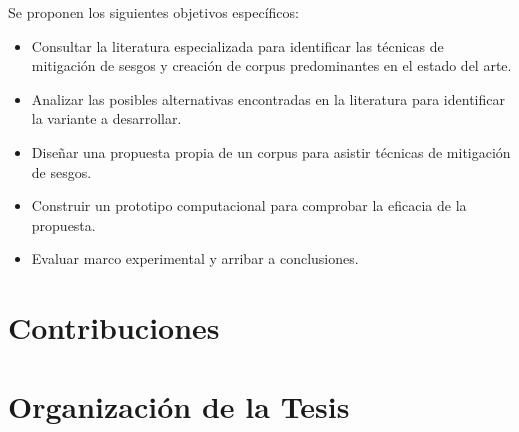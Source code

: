 Se proponen los siguientes objetivos espec\'ificos:
\begin{itemize}
    \item Consultar la literatura especializada para identificar las t\'ecnicas de mitigaci\'on de sesgos y creaci\'on
    de corpus predominantes en el estado del arte.
    \item Analizar las posibles alternativas encontradas en la literatura para identificar la variante a desarrollar.
    \item Dise\~nar una propuesta propia de un corpus para asistir t\'ecnicas de mitigaci\'on de sesgos. 
    \item Construir un prototipo computacional para comprobar la eficacia de la propuesta.
    \item Evaluar marco experimental y arribar a conclusiones.
\end{itemize}

\section*{Contribuciones}


\section*{Organizaci\'on de la Tesis}
